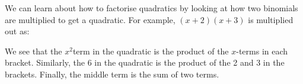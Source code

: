       \label{m39394*id275684}We can learn about how to factorise quadratics by looking at how two binomials are multiplied to get a quadratic. For example, $\left(x+2\right)\left(x+3\right)$ is multiplied out as:\par 
      \label{m39394*id275716}\nopagebreak\noindent{}
      \label{m39394*id275871}We see that the ${x}^{2}$\hspace{1ex}term in the quadratic is the product of the $x$-terms in each bracket. Similarly, the 6 in the quadratic is the product of the 2 and 3 in the brackets. Finally, the middle term is the sum of two terms.\par 
